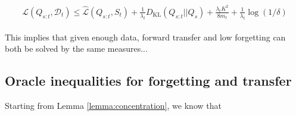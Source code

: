 \documentclass[letterpaper]{article}
\theoremstyle{definition}
\begin{document}
\begin{align}
\begin{split}
\mathcal{L}(Q_{s:t},\mathcal{D}_t) \leq \hat{\mathcal{L}}(Q_{s:t}, S_t) + \frac{1}{\lambda_t} D_{\mathrm{KL}}(Q_{s:t}||Q_{s})+\frac{\lambda_t K^2}{8m_t}+\frac{1}{\lambda_t}\log(1/\delta)
\end{split}
\end{align}

This implies that given enough data, forward transfer and low forgetting can both be solved by the same measures...





\subsection{Oracle inequalities for forgetting and transfer}

Starting from Lemma \ref{lemma:concentration}, we know that 
\end{document}
